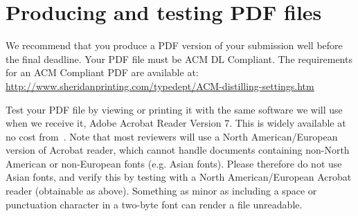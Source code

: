 \documentclass{chi-ext}
\begin{document}
\section{Producing and testing PDF files}
We recommend that you produce a PDF version of your submission well before the final deadline. 
Your PDF file must be ACM DL Compliant. 
The requirements for an ACM Compliant PDF are available at:
\url{http://www.sheridanprinting.com/typedept/ACM-distilling-settings.htm}

Test your PDF file by viewing or printing it with the same software we will use when we receive it, Adobe Acrobat Reader Version 7. 
This is widely available at no cost from~\cite{Acrobat7}.  
Note that most reviewers will use a North American/European version of Acrobat reader, which cannot handle documents containing non-North American or non-European fonts (e.g. Asian fonts).  
Please therefore do not use Asian fonts, and verify this by testing with a North American/European Acrobat reader (obtainable as above). Something as minor as including a space or punctuation character in a two-byte font can render a file unreadable.


\end{document}
